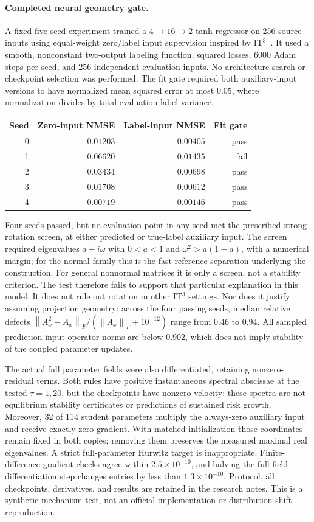 \documentclass[11pt,a4paper]{article}
\newcommand{\norm}[1]{\left\lVert #1\right\rVert}
\begin{document}
\paragraph{Completed neural geometry gate.}
A fixed five-seed experiment trained a $4\to16\to2$ tanh regressor on
256 source inputs using equal-weight zero/label input supervision inspired
by IT$^3$~\cite{it3}. It used a smooth, nonconstant two-output labeling
function, squared losses, 6000 Adam steps per seed, and 256 independent
evaluation inputs. No architecture search or checkpoint selection was
performed. The fit gate required both auxiliary-input versions to have
normalized mean squared error at most $0.05$, where normalization divides
by total evaluation-label variance.
\begin{center}
\begin{tabular}{rrrr}
Seed & Zero-input NMSE & Label-input NMSE & Fit gate\\ \hline
0 & $0.01203$ & $0.00405$ & pass\\
1 & $0.06620$ & $0.01435$ & fail\\
2 & $0.03434$ & $0.00698$ & pass\\
3 & $0.01708$ & $0.00612$ & pass\\
4 & $0.00719$ & $0.00146$ & pass
\end{tabular}
\end{center}
Four seeds passed, but no evaluation point in any seed met the prescribed
strong-rotation screen, at either predicted or true-label auxiliary input.
The screen required eigenvalues $a\pm i\omega$ with $0<a<1$ and
$\omega^2>a(1-a)$, with a numerical margin; for the normal family this is
the fast-reference separation underlying the construction. For general
nonnormal matrices it is only a screen, not a stability criterion.
The test therefore fails to support that particular explanation in this
model. It does not rule out rotation in other IT$^3$ settings.
Nor does it justify assuming projection geometry: across the four passing
seeds, median relative defects
$\norm{A_x^2-A_x}_F/(\norm{A_x}_F+10^{-12})$ range from $0.46$ to $0.94$.
All sampled prediction-input operator norms are below $0.902$, which does
not imply stability of the coupled parameter updates.

The actual full parameter fields were also differentiated, retaining
nonzero-residual terms. Both rules have positive instantaneous spectral
abscissae at the tested $\tau=1,20$, but the checkpoints have nonzero
velocity: these spectra are not equilibrium stability certificates or
predictions of sustained risk growth. Moreover, 32 of 114 student
parameters multiply the always-zero auxiliary input and receive exactly
zero gradient. With matched initialization those coordinates remain fixed
in both copies; removing them preserves the measured maximal real
eigenvalues. A strict full-parameter Hurwitz target is inappropriate.
Finite-difference gradient checks agree within $2.5\times10^{-10}$, and
halving the full-field differentiation step changes entries by less than
$1.3\times10^{-10}$. Protocol, all checkpoints, derivatives, and results
are retained in the research notes. This is a synthetic mechanism test,
not an official-implementation or distribution-shift reproduction.
\end{document}
